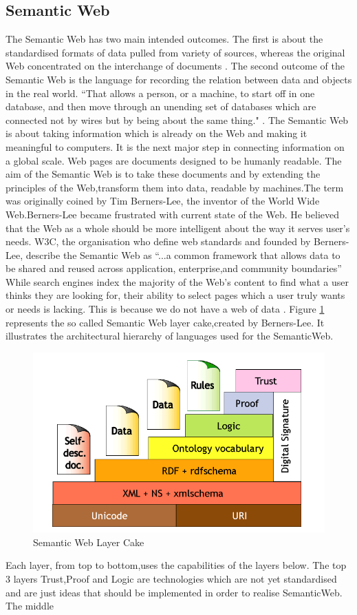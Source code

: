 \subsection{Semantic Web}\label{semanticweb}
The Semantic Web has two main intended outcomes. The first is about the standardised formats of data pulled from variety of sources, whereas the original Web concentrated on the interchange of documents \cite{semantic}. The second outcome of the Semantic Web is the language for recording the relation between data and objects in the real world. ``That allows a person, or a machine, to start off in one database, and then move through an unending set of databases which are connected not by wires but by being about the same thing."  \cite{semantic}.  The Semantic Web is about taking information which is already on the Web and making it meaningful to computers. It is the next major step in connecting information on a global scale. Web pages are documents designed to be humanly readable. The aim of the Semantic Web is to take these documents and by extending the principles of the Web,transform them into data, readable by machines.The term was originally coined by Tim Berners-Lee, the inventor of the World Wide Web.Berners-Lee became frustrated with current state of the Web. He believed that the Web as a whole should be more intelligent about the way it serves user's needs. W3C, the organisation who define web standards and founded by Berners-Lee, describe the Semantic Web as ``...a common framework that allows data to be shared and reused across application, enterprise,and community boundaries'' \cite{w3c1} While search engines index the majority of the Web's content to find what a user thinks they are looking for, their ability to select pages which a user truly wants or needs is lacking. This is because we do not have a web of data \cite{cake}. Figure \ref{fig:sw} represents the so called Semantic Web layer cake,created by Berners-Lee. It illustrates the architectural hierarchy of languages used for the SemanticWeb. \begin{figure}\includegraphics[width=1\linewidth]{images/semanticwebcake}\caption{Semantic Web Layer Cake \cite{cake}}\label{fig:sw}\end{figure} Each layer, from top to bottom,uses the capabilities of the layers below. The top 3 layers Trust,Proof and Logic are technologies which are not yet standardised and are just ideas that should be implemented in order to realise SemanticWeb. The middle 